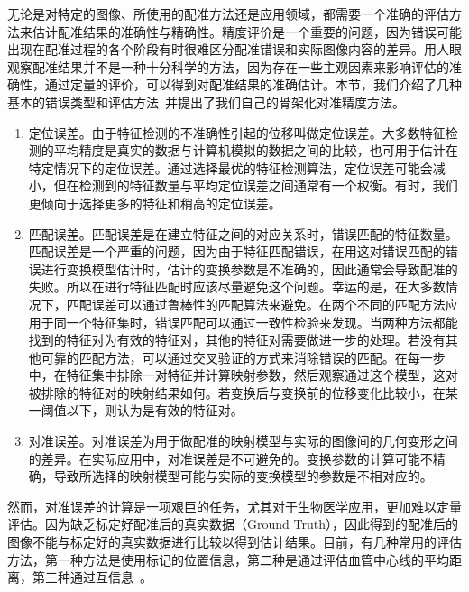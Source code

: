 无论是对特定的图像、所使用的配准方法还是应用领域，都需要一个准确的评估方法来估计配准结果的准确性与精确性。精度评价是一个重要的问题，因为错误可能出现在配准过程的各个阶段有时很难区分配准错误和实际图像内容的差异。用人眼观察配准结果并不是一种十分科学的方法，因为存在一些主观因素来影响评估的准确性，通过定量的评价，可以得到对配准结果的准确估计。本节，我们介绍了几种基本的错误类型和评估方法~\cite{barbara}并提出了我们自己的骨架化对准精度方法。


\begin{enumerate}
\item 定位误差。由于特征检测的不准确性引起的位移叫做定位误差。大多数特征检测的平均精度是真实的数据与计算机模拟的数据之间的比较，也可用于估计在特定情况下的定位误差。通过选择最优的特征检测算法，定位误差可能会减小，但在检测到的特征数量与平均定位误差之间通常有一个权衡。有时，我们更倾向于选择更多的特征和稍高的定位误差。

\item 匹配误差。匹配误差是在建立特征之间的对应关系时，错误匹配的特征数量。匹配误差是一个严重的问题，因为由于特征匹配错误，在用这对错误匹配的错误进行变换模型估计时，估计的变换参数是不准确的，因此通常会导致配准的失败。所以在进行特征匹配时应该尽量避免这个问题。幸运的是，在大多数情况下，匹配误差可以通过鲁棒性的匹配算法来避免。在两个不同的匹配方法应用于同一个特征集时，错误匹配可以通过一致性检验来发现。当两种方法都能找到的特征对为有效的特征对，其他的特征对需要做进一步的处理。若没有其他可靠的匹配方法，可以通过交叉验证的方式来消除错误的匹配。在每一步中，在特征集中排除一对特征并计算映射参数，然后观察通过这个模型，这对被排除的特征对的映射结果如何。若变换后与变换前的位移变化比较小，在某一阈值以下，则认为是有效的特征对。

\item 对准误差。对准误差为用于做配准的映射模型与实际的图像间的几何变形之间的差异。在实际应用中，对准误差是不可避免的。变换参数的计算可能不精确，导致所选择的映射模型可能与实际的变换模型的参数是不相对应的。

\end{enumerate}


然而，对准误差的计算是一项艰巨的任务，尤其对于生物医学应用，更加难以定量评估。因为缺乏标定好配准后的真实数据（Ground Truth），因此得到的配准后的图像不能与标定好的真实数据进行比较以得到估计结果。目前，有几种常用的评估方法，第一种方法是使用标记的位置信息，第二种是通过评估血管中心线的平均距离，第三种通过互信息~\cite{kolar}。

